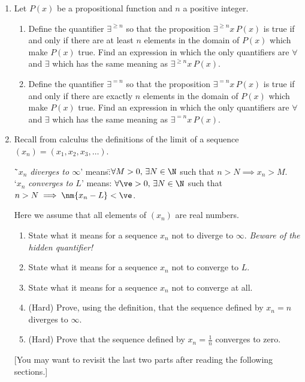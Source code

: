 \begin{enumerate}
	
	  \item Let $P(x)$ be a propositional function and $n$ a positive integer.
  \begin{enumerate}
      \item Define the quantifier $\exists^{\geq n}$ so that the proposition $\exists^{\geq n} x \, P(x)$ is true if and only if there are at least $n$ elements in the domain of $P(x)$ which make $P(x)$ true. Find an expression in which the only quantifiers are $\forall$ and $\exists$ which has the same meaning as $\exists^{\geq n} x \, P(x)$.
      \item Define the quantifier $\exists^{= n}$ so that the proposition $\exists^{= n} x \, P(x)$ is true if and only if there are exactly $n$ elements in the domain of $P(x)$ which make $P(x)$ true. Find an expression in which the only quantifiers are $\forall$ and $\exists$ which has the same meaning as $\exists^{= n} x \, P(x)$.
  \end{enumerate}
	
	\item \label{ex:seqlim} Recall from calculus the definitions of the limit of a sequence $(x_n)=(x_1,x_2,x_3,\ldots)$.
	\begin{tabbing}
	  \=`$x_n$ \emph{diverges to $\infty$}' means:\qquad\qquad \=$\forall M>0,\,\exists N\in\N$ such that $n>N\implies x_n>M$.\\[5pt]
	  \>`$x_n$ \emph{converges to $L$}' means: \>$\forall\ve>0,\,\exists N\in\N$ such that $n>N\implies \nm{x_n-L}<\ve$.
	\end{tabbing}
	Here we assume that all elements of $(x_n)$ are real numbers.
	\begin{enumerate}
	  \item State what it means for a sequence $x_n$ not to diverge to $\infty$. \emph{Beware of the hidden quantifier!}
	  \item State what it means for a sequence $x_n$ not to converge to $L$.
	  \item State what it means for a sequence $x_n$ not to converge at all.
	  \item (Hard) Prove, using the definition, that the sequence defined by $x_n=n$ diverges to $\infty$.
	  \item (Hard) Prove that the sequence defined by $x_n=\frac 1n$ converges to zero.
	\end{enumerate}
	[You may want to revisit the last two parts after reading the following sections.]
	
\end{enumerate}


